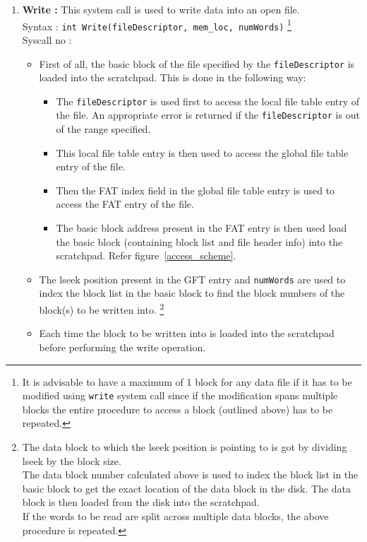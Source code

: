 \begin{enumerate}
	\item \textbf{Write :} This system call is used to write data into an open file. \\
	Syntax : \texttt{int Write(fileDescriptor, mem\_loc, numWords)} 
	\footnote{It is advisable to have  a maximum of 1 block 
	for any data file if it has to be modified using \texttt{write} system call since if the modification spans 
	multiple blocks the entire procedure to access a block (outlined above) has to be repeated.} \\ 
	Syscall no : 
	\begin{itemize}
		\item First of all, the basic block of the file specified by the \texttt{fileDescriptor} is loaded into the scratchpad. This is done in the following way:
		\begin{itemize}
			\item The \texttt{fileDescriptor} is used first to access the local file table entry of the file. An appropriate error is returned if the \texttt{fileDescriptor} is out of the range specified.
			\item This local file table entry is then used to access the global file table entry of the file.
			\item Then the FAT index field in the global file table entry is used to access the FAT entry of the file.
			\item The basic block address present in the FAT entry is then used load the basic block (containing block list and file header info) into the scratchpad. Refer figure~\ref{access_scheme}.
		\end{itemize}	
		\item The lseek position present in the GFT entry and \texttt{numWords} are used to index the block list in the basic block to find the block numbers of the block(s) to be written into. \footnote{The data block to which the lseek position is pointing to is got by dividing lseek by the block size. \\
		The data block number calculated above is used to index the block list in the basic block to get the exact location of the data block in the disk. The data block is then loaded from the disk into the scratchpad. \\
		If the words to be read are split across multiple data blocks, the above procedure is repeated.}
		\item Each time the block to be written into is loaded into the scratchpad before performing the write operation.

\end{itemize}
\end{enumerate}
